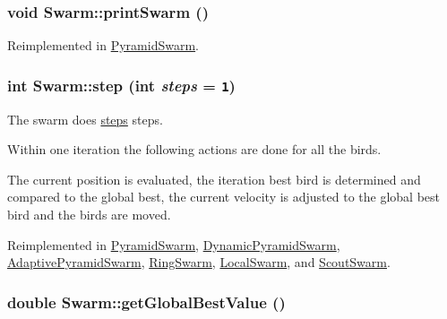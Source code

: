 \hypertarget{classSwarm_3e480dd422f3babe42d22d5af097c2ba}{
\subsubsection{\setlength{\rightskip}{0pt plus 5cm}void Swarm::printSwarm ()}}
\label{classSwarm_3e480dd422f3babe42d22d5af097c2ba}




Reimplemented in \hyperlink{classPyramidSwarm_85ec37731cf16f817ae7523e890a267e}{PyramidSwarm}.\hypertarget{classSwarm_7ab61f9797ce80e2edfb2bd881d7147c}{
\subsubsection{\setlength{\rightskip}{0pt plus 5cm}int Swarm::step (int {\em steps} = {\tt 1})}}
\label{classSwarm_7ab61f9797ce80e2edfb2bd881d7147c}


The swarm does \hyperlink{runpso_8cpp_b4ae7205573977222eadd0795db193e2}{steps} steps. 

Within one iteration the following actions are done for all the birds.\par
 The current position is evaluated, the iteration best bird is determined and compared to the global best, the current velocity is adjusted to the global best bird and the birds are moved. 

Reimplemented in \hyperlink{classPyramidSwarm_a9a21f0581b43dc3549fee12d6f2229e}{PyramidSwarm}, \hyperlink{classDynamicPyramidSwarm_ffcde6a425fd052c0bd5a65124a204a1}{DynamicPyramidSwarm}, \hyperlink{classAdaptivePyramidSwarm_0d2d0278504ad096f288d8efe5dbf360}{AdaptivePyramidSwarm}, \hyperlink{classRingSwarm_a5441ba339db7fc269f4784917189eab}{RingSwarm}, \hyperlink{classLocalSwarm_0321819616ea5252dde257b6d1f739db}{LocalSwarm}, and \hyperlink{classScoutSwarm_4b8c1a2e57b949b3259c118fbadcb781}{ScoutSwarm}.\hypertarget{classSwarm_29b92fc70b57a38a6db7a03d6f9df4ea}{
\subsubsection{\setlength{\rightskip}{0pt plus 5cm}double Swarm::getGlobalBestValue ()}}
\label{classSwarm_29b92fc70b57a38a6db7a03d6f9df4ea}


